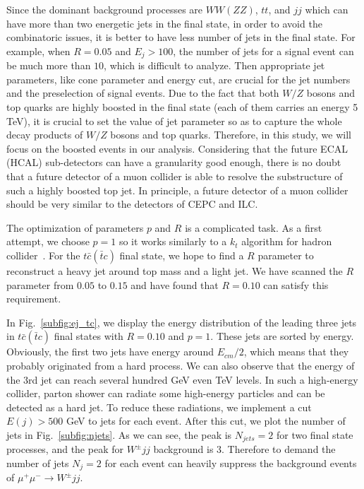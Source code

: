 \documentclass[a4paper,11pt]{article}
\begin{document}
Since the dominant background processes are $WW (ZZ)$, $tt$, 
and $jj$ which can have more than two energetic jets in the final state, 
in order to avoid the combinatoric issues, it is better to have less number of jets in the final state. 
For example, when $R=0.05$ and $E_j>100$,
the number of jets for a signal event can be much more than $10$, which is difficult to analyze. 
Then appropriate jet parameters, like cone parameter and energy cut, 
are crucial for the jet numbers and the preselection of signal events. 
Due to the fact that both $W/Z$ bosons and top quarks are highly boosted in the final state 
(each of them carries an energy 5 TeV), 
it is crucial to set the value of jet parameter so as to capture the whole decay products of $W/Z$ bosons and top quarks. Therefore, in this study, we will focus on the boosted events in our analysis. Considering that the future ECAL (HCAL) sub-detectors can have a granularity good enough,  there is no doubt that a future detector of a muon collider is able to resolve the substructure of such a highly boosted top jet. In principle, a future detector of a muon collider should be very similar to the detectors of CEPC and ILC.

The optimization of parameters $p$ and $R$ is a complicated task.
As a first attempt, we choose $p=1$ so it works similarly to a $k_t$ algorithm for hadron collider~\cite{Catani:1993hr,Ellis:1993tq}. 
For the $t\bar{c}(\bar{t}c)$ final state, we hope to find a $R$ parameter to reconstruct a heavy jet around top mass and a light jet.
We have scanned the $R$ parameter from $0.05$ to $0.15$ and have found that $R=0.10$ can satisfy this requirement. 

In Fig.~\ref{subfig:ej_tc}, we display the energy distribution of the leading three jets in $t\bar{c}(\bar{t}c)$ final states with $R=0.10$ and $p=1$. 
These jets are sorted by energy.  Obviously, the first two jets have energy around $E_{cm}/2$, 
which means that they probably originated from a hard process.
We can also observe that the energy of the 3rd jet can reach several hundred GeV even TeV levels.
In such a high-energy collider, parton shower can radiate some high-energy particles and can be detected as a hard jet. To reduce these radiations, we implement a cut $E(j)>500$ GeV to jets for each event. 
After this cut, we plot the number of jets in Fig.~\ref{subfig:njets}. 
As we can see, the peak is $N_{jets}=2$ for two final state processes, and the peak for $W^{\pm}jj$ background is 3.  Therefore to demand the number of jets $N_j=2$ for each event can heavily suppress the background events of $\mu^+ \mu^- \to W^{\pm}jj$.
\end{document}
